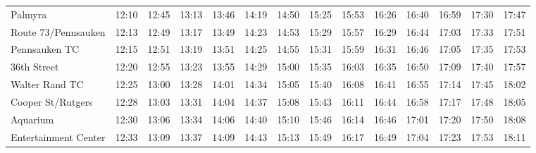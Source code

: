 \begin{center}
\begin{tabular}{@{}lrrrrrrrrrrrrr@{}}
Palmyra & 12:10 & 12:45 & 13:13 & 13:46 & 14:19 & 14:50 & 15:25 & 15:53 & 16:26 & 16:40 & 16:59 & 17:30 & 17:47 \\
Route 73/Pennsauken & 12:13 & 12:49 & 13:17 & 13:49 & 14:23 & 14:53 & 15:29 & 15:57 & 16:29 & 16:44 & 17:03 & 17:33 & 17:51 \\
Pennsauken TC & 12:15 & 12:51 & 13:19 & 13:51 & 14:25 & 14:55 & 15:31 & 15:59 & 16:31 & 16:46 & 17:05 & 17:35 & 17:53 \\
36th Street & 12:20 & 12:55 & 13:23 & 13:55 & 14:29 & 15:00 & 15:35 & 16:03 & 16:35 & 16:50 & 17:09 & 17:40 & 17:57 \\
Walter Rand TC & 12:25 & 13:00 & 13:28 & 14:01 & 14:34 & 15:05 & 15:40 & 16:08 & 16:41 & 16:55 & 17:14 & 17:45 & 18:02 \\
Cooper St/Rutgers & 12:28 & 13:03 & 13:31 & 14:04 & 14:37 & 15:08 & 15:43 & 16:11 & 16:44 & 16:58 & 17:17 & 17:48 & 18:05 \\
Aquarium & 12:30 & 13:06 & 13:34 & 14:06 & 14:40 & 15:10 & 15:46 & 16:14 & 16:46 & 17:01 & 17:20 & 17:50 & 18:08 \\
Entertainment Center & 12:33 & 13:09 & 13:37 & 14:09 & 14:43 & 15:13 & 15:49 & 16:17 & 16:49 & 17:04 & 17:23 & 17:53 & 18:11 \\
\bottomrule\end{tabular}\end{center}
